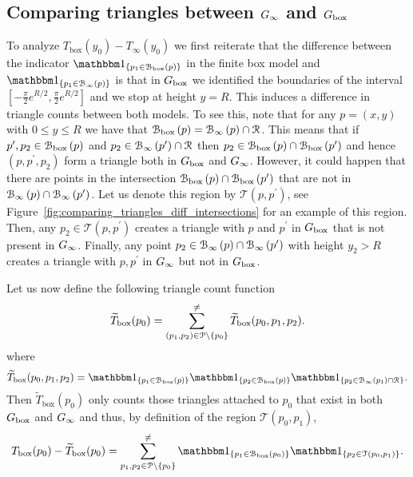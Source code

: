 \subsection{Comparing triangles between $G_{\infty}$ and $G_{\mathrm{box}}$}

To analyze $T_{\text{box}}(y_0) - T_\infty(y_0)$ we first reiterate that the difference between the indicator $\ind{p_1 \in \BallPon{p}}$ in the finite box model and $\ind{p_1 \in \BallPo{p}}$ is that in $G_{\mathrm{box}}$ we identified the boundaries of the interval $[-\frac{\pi}{2}e^{R/2}, \frac{\pi}{2} e^{R/2}]$ and we stop at height $y = R$. This induces a difference in triangle counts between both models. 
To see this, note that for any $p = (x,y)$ with $0 \le y \le R$ we have that ${\mathcal B}_{\text{box}}\left(p\right) = {\mathcal B}_{\infty}\left(p\right) \cap {\mathcal R}$. This means that if $p^\prime, p_2 \in {\mathcal B}_{\text{box}}\left(p\right)$ and $p_2 \in {\mathcal B}_{\infty}\left(p^\prime\right) \cap {\mathcal R}$ then $p_2 \in {\mathcal B}_{\text{box}}\left(p\right) \cap {\mathcal B}_{\text{box}}\left(p^\prime\right)$ and hence $(p,p^\prime,p_2)$ form a triangle both in $G_{\mathrm{box}}$ and $G_{\infty}$. However, it could happen that there are points in the intersection ${\mathcal B}_{\text{box}}\left(p\right) \cap {\mathcal B}_{\text{box}}\left(p^\prime\right)$ that are not in ${\mathcal B}_{\infty}\left(p\right) \cap {\mathcal B}_{\infty}\left(p^\prime\right)$. Let us denote this region by $\mathcal{T}(p,p^\prime)$, see Figure~\ref{fig:comparing_triangles_diff_intersections} for an example of this region. Then, any $p_2 \in \mathcal{T}(p,p^\prime)$ creates a triangle with $p$ and $p^\prime$ in $G_{\mathrm{box}}$ that is not present in $G_{\infty}$. Finally, any point $p_2 \in {\mathcal B}_{\infty}\left(p\right) \cap {\mathcal B}_{\infty}\left(p^\prime\right)$ with height $y_2 > R$ creates a triangle with $p, p^\prime$ in $G_{\infty}$ but not in $G_{\mathrm{box}}$.

Let us now define the following triangle count function
\[
	\widetilde{T}_{\text{box}}(p_0) = \sum_{(p_1, p_2) \in {\mathcal P} \setminus \{p_0\}}^{\ne} 
		\widetilde{T}_{\text{box}}(p_0,p_1,p_2).
\]
where
\[
	\widetilde{T}_{\text{box}}(p_0,p_1,p_2) = \ind{p_1 \in \BallPon{p}}\ind{p_2 \in \BallPon{p}}\ind{p_2 \in \BallPo{p_1} \cap \Rcal}.
\]
Then $\widetilde{T}_{\text{box}}(p_0)$ only counts those triangles attached to $p_0$ that exist in both $G_{\mathrm{box}}$ and $G_{\infty}$ and thus, by definition of the region $\mathcal{T}(p_0,p_1)$,
\[
	T_{\text{box}}(p_0) - \widetilde{T}_{\text{box}}(p_0)
	= \sum_{p_1, p_2 \in \Pcal \setminus \{p_0\}}^{\ne} \ind{p_1 \in \BallPon{p_0}} 
			\ind{p_2 \in \mathcal{T}(p_0, p_1)}.
\]


